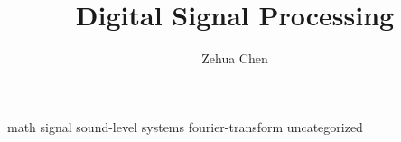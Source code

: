 \documentclass[letterpaper, 11pt]{report}
\title{Digital Signal Processing}
\author{Zehua Chen}
\begin{document}
  \maketitle
  \tableofcontents

  \setmainstyles

  {math}
  {signal}
  {sound-level}
  {systems}
  {fourier-transform}
  {uncategorized}

  \newpage
  \printglossary
\end{document}
